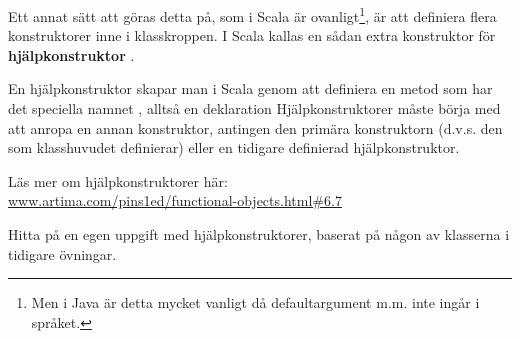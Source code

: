 Ett annat sätt att göras detta på, som i Scala är ovanligt\footnote{Men i Java är detta mycket vanligt då defaultargument m.m. inte ingår i språket.}, är att definiera flera konstruktorer inne i klasskroppen. I Scala kallas en sådan extra konstruktor för \textbf{hjälpkonstruktor} .

En hjälpkonstruktor skapar man i Scala genom att definiera en metod som har det speciella namnet , alltså en deklaration  Hjälpkonstruktorer måste börja med att anropa en annan konstruktor, antingen den primära konstruktorn (d.v.s. den som klasshuvudet definierar) eller en tidigare definierad  hjälpkonstruktor.

\Subtask Läs mer om hjälpkonstruktorer här: \\ \href{http://www.artima.com/pins1ed/functional-objects.html#6.7}{www.artima.com/pins1ed/functional-objects.html\#6.7}

\Subtask Hitta på en egen uppgift med hjälpkonstruktorer, baserat på någon av klasserna i tidigare övningar.



\QUESTEND
